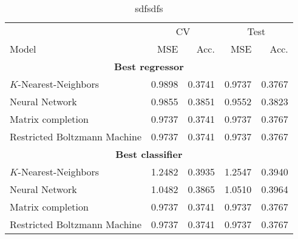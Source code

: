 \begin{table}
\centering
\caption{sdfsdfs}
\label{tab:results.model}
\begin{tabular}{lrrrr}
\toprule
	      &  \multicolumn{2}{c}{CV} & \multicolumn{2}{c}{Test} \\
           \cmidrule(lr){2-3}\cmidrule(lr){4-5}
Model	 &  MSE & Acc. & MSE & Acc.  \\
\midrule
\multicolumn{5}{c}{\textbf{Best regressor}}\\
$K$-Nearest-Neighbors 					&   0.9898 &      0.3741 &   0.9737 &        0.3767 \\
Neural Network 							&   0.9855 &      0.3851 &   0.9552 &        0.3823 \\
Matrix completion 						&   0.9737 &      0.3741 &   0.9737 &        0.3767 \\
Restricted Boltzmann Machine 			&   0.9737 &      0.3741 &   0.9737 &        0.3767 \\
\midrule
\multicolumn{5}{c}{\textbf{Best classifier}}\\
$K$-Nearest-Neighbors 					&   1.2482 &      0.3935 &   1.2547 &        0.3940 \\
Neural Network 							&   1.0482 &      0.3865 &   1.0510 &        0.3964 \\
Matrix completion 						&   0.9737 &      0.3741 &   0.9737 &        0.3767 \\
Restricted Boltzmann Machine 			&   0.9737 &      0.3741 &   0.9737 &        0.3767 \\
\bottomrule
\end{tabular}
\end{table}
